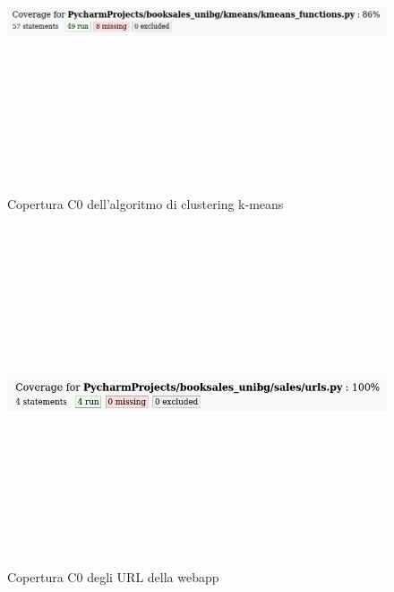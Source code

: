 \documentclass[10pt,a4paper]{report}
\begin{document}
	\begin{figure}[H]
		\centering
		\includegraphics[height=10cm, width=15cm, keepaspectratio]{images/kmeans_test.png}
		\caption{Copertura C0 dell'algoritmo di clustering k-means}
	\end{figure}

	\begin{figure}[H]
		\centering
		\includegraphics[height=10cm, width=15cm, keepaspectratio]{images/sales_urls_test.png}
		\caption{Copertura C0 degli URL della webapp}
	\end{figure}
\end{document}

